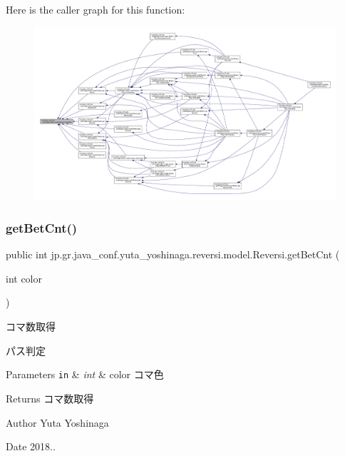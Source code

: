 Here is the caller graph for this function\+:\nopagebreak
\begin{figure}[H]
\begin{center}
\leavevmode
\includegraphics[width=350pt]{classjp_1_1gr_1_1java__conf_1_1yuta__yoshinaga_1_1reversi_1_1model_1_1_reversi_afbad8b2c3b2423a7490f9a3b636584d3_icgraph}
\end{center}
\end{figure}
\mbox{\label{classjp_1_1gr_1_1java__conf_1_1yuta__yoshinaga_1_1reversi_1_1model_1_1_reversi_a9f826e110ec3298a6bc5d6987a94519c}} 
\subsubsection{\texorpdfstring{get\+Bet\+Cnt()}{getBetCnt()}}
{\footnotesize\ttfamily public int jp.\+gr.\+java\+\_\+conf.\+yuta\+\_\+yoshinaga.\+reversi.\+model.\+Reversi.\+get\+Bet\+Cnt (\begin{DoxyParamCaption}\item[{int}]{color }\end{DoxyParamCaption})}



コマ数取得 

パス判定


\begin{DoxyParams}[1]{Parameters}
\mbox{\tt in}  & {\em int} & color コマ色 \\
\hline
\end{DoxyParams}
\begin{DoxyReturn}{Returns}
コマ数取得 
\end{DoxyReturn}
\begin{DoxyAuthor}{Author}
Yuta Yoshinaga 
\end{DoxyAuthor}
\begin{DoxyDate}{Date}
2018..
\end{DoxyDate}

